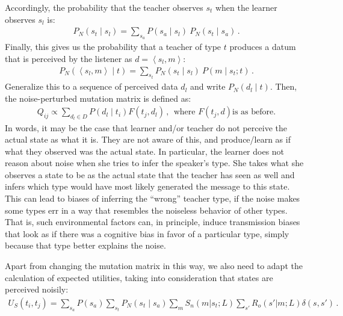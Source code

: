 \documentclass[a4paper]{article}
\newcommand{\tuple}[1]{\ensuremath{\left\langle #1 \right\rangle}}
\begin{document}
Accordingly, the probability that the teacher observes $s_t$ when the learner observes $s_l$ is:
\begin{align*}
  P_N(s_t \mid s_l) = \sum_{s_a} P(s_a \mid s_l) \ P_N(s_t \mid s_a)\,.
\end{align*}
Finally, this gives us the probability that a teacher of type $t$ produces a datum that is
perceived by the listener as $d = \tuple{s_l, m}$:
\begin{align*}
  P_N(\tuple{s_l, m} \mid t) = \sum_{s_t} P_N(s_t \mid s_l) \ P(m \mid s_t; t)\,.
\end{align*}
Generalize this to a sequence of perceived data $d_l$ and write $P_N(d_l \mid t)$. Then, the noise-perturbed mutation matrix is defined as:
\begin{align*}
  Q_{ij}  \propto \sum_{d_l \in D} P(d_l \mid t_i) F(t_j,d_l) \,, \ \  \text{where $F(t_j,d)$
    is as before.}
\end{align*}
In words, it may be the case that learner and/or teacher do not perceive the actual state as what it is. They are not aware of this, and produce/learn as if what they observed was the actual state. In particular, the learner does not reason about noise when she tries to infer the speaker's type. She takes what she observes a state to be as the actual state that the teacher has seen as well and infers which type would have most likely generated the message to this state. This can lead to biases of inferring the ``wrong'' teacher type, if the noise makes some types err in a way that resembles the noiseless behavior of other types. That is, such environmental factors can, in principle, induce transmission biases that look as if there was a cognitive bias in favor of a particular type, simply because that type better explains the noise.

Apart from changing the mutation matrix in this way, we also need to adapt the calculation of expected utilities, taking into consideration that states are perceived noisily:
\begin{align*}
  U_S(t_i,t_j) = \sum_{s_a}  P(s_a) \sum_{s_t} P_N(s_t \mid s_a) \sum_m S_n(m|s_t;L) \sum_{s'} R_o(s'|m;L) \delta(s,s')\,.
\end{align*}
\end{document}
